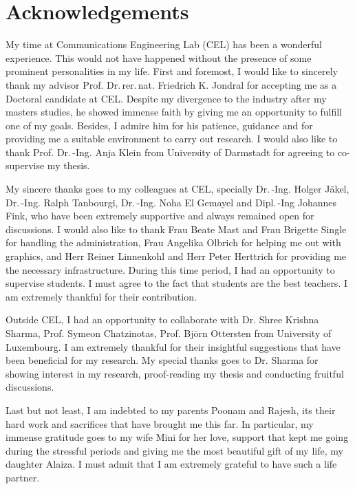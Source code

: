 \chapter*{Acknowledgements}

My time at Communications Engineering Lab (CEL) has been a wonderful experience. This would not have happened without the presence of some prominent personalities in my life. First and foremost, I would like to sincerely thank my advisor Prof. Dr.\,rer.\,nat. Friedrich K. Jondral for accepting me as a Doctoral candidate at CEL. %
Despite my divergence to the industry after my masters studies, he showed immense faith by giving me an opportunity to fulfill one of my goals. 
Besides, I admire him for his patience, guidance and for providing me a suitable environment to carry out research. I would also like to thank Prof. Dr.\,-Ing. Anja Klein from University of Darmstadt for agreeing to co-supervise my thesis.

My sincere thanks goes to my colleagues at CEL, specially Dr.\,-Ing. Holger J\"akel, Dr.\,-Ing. Ralph Tanbourgi, Dr.\,-Ing. Noha El Gemayel and Dipl.\,-Ing Johannes Fink, who have been extremely supportive and always remained open for discussions. I would also like to thank Frau Beate Mast and Frau Brigette Single for handling the administration, Frau Angelika Olbrich for helping me out with graphics, and Herr Reiner Linnenkohl and Herr Peter Herttrich for providing me the necessary infrastructure. During this time period, I had an opportunity to supervise students. I must agree to the fact that students are the best teachers. I am extremely thankful for their contribution. 

Outside CEL, I had an opportunity to collaborate with Dr. Shree Krishna Sharma, Prof. Symeon Chatzinotas, Prof. Bj\"orn Ottersten from University of Luxembourg. I am extremely thankful for their insightful suggestions that have been beneficial for my research. My special thanks goes to Dr. Sharma for showing interest in my research, proof-reading my thesis and conducting fruitful discussions. 

Last but not least, I am indebted to my parents Poonam and Rajesh, its their hard work and sacrifices that have brought me this far. In particular, my immense gratitude goes to my wife Mini for her love, support that kept me going during the stressful periods and giving me the most beautiful gift of my life, my daughter Alaiza. I must admit that I am extremely grateful to have such a life partner. 
